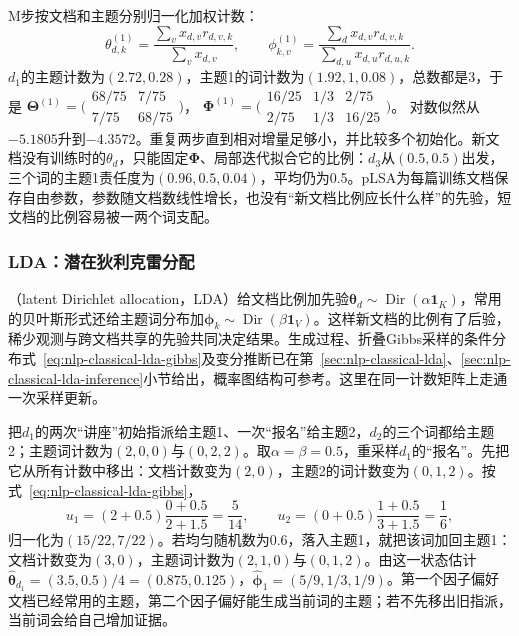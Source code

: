 M步按文档和主题分别归一化加权计数：
\[
 \theta_{d,k}^{(1)}=\frac{\sum_vx_{d,v}r_{d,v,k}}{\sum_vx_{d,v}},\qquad
 \phi_{k,v}^{(1)}=\frac{\sum_dx_{d,v}r_{d,v,k}}{\sum_{d,u}x_{d,u}r_{d,u,k}}.
\]
$d_1$的主题计数为$(2.72,0.28)$，主题1的词计数为$(1.92,1,0.08)$，总数都是3，于是
$\bm\Theta^{(1)}=\bigl(\begin{smallmatrix}68/75&7/75\\7/75&68/75\end{smallmatrix}\bigr)$，
$\bm\Phi^{(1)}=\bigl(\begin{smallmatrix}16/25&1/3&2/75\\2/75&1/3&16/25\end{smallmatrix}\bigr)$。
对数似然从$-5.1805$升到$-4.3572$。重复两步直到相对增量足够小，并比较多个初始化。新文档没有训练时的$\theta_d$，只能固定$\bm\Phi$、局部迭代拟合它的比例：$d_3$从$(0.5,0.5)$出发，三个词的主题1责任度为$(0.96,0.5,0.04)$，平均仍为0.5。pLSA为每篇训练文档保存自由参数，参数随文档数线性增长，也没有“新文档比例应长什么样”的先验，短文档的比例容易被一两个词支配。

\subsubsection{LDA：潜在狄利克雷分配}
\label{sec:nlp-classification-lda}

（latent Dirichlet allocation，LDA）给文档比例加先验$\bm\theta_d\sim\operatorname{Dir}(\alpha\bm1_K)$，常用的贝叶斯形式还给主题词分布加$\bm\phi_k\sim\operatorname{Dir}(\beta\bm1_V)$。这样新文档的比例有了后验，稀少观测与跨文档共享的先验共同决定结果。生成过程、折叠Gibbs采样的条件分布式~\eqref{eq:nlp-classical-lda-gibbs}及变分推断已在第~\ref{sec:nlp-classical-lda}、\ref{sec:nlp-classical-lda-inference}小节给出，概率图结构可参考。这里在同一计数矩阵上走通一次采样更新。

把$d_1$的两次“讲座”初始指派给主题1、一次“报名”给主题2，$d_2$的三个词都给主题2；主题词计数为$(2,0,0)$与$(0,2,2)$。取$\alpha=\beta=0.5$，重采样$d_1$的“报名”。先把它从所有计数中移出：文档计数变为$(2,0)$，主题2的词计数变为$(0,1,2)$。按式~\eqref{eq:nlp-classical-lda-gibbs}，
\[
 u_1=(2+0.5)\frac{0+0.5}{2+1.5}=\frac5{14},\qquad
 u_2=(0+0.5)\frac{1+0.5}{3+1.5}=\frac16,
\]
归一化为$(15/22,7/22)$。若均匀随机数为0.6，落入主题1，就把该词加回主题1：文档计数变为$(3,0)$，主题词计数为$(2,1,0)$与$(0,1,2)$。由这一状态估计$\widehat{\bm\theta}_{d_1}=(3.5,0.5)/4=(0.875,0.125)$，$\widehat{\bm\phi}_1=(5/9,1/3,1/9)$。第一个因子偏好文档已经常用的主题，第二个因子偏好能生成当前词的主题；若不先移出旧指派，当前词会给自己增加证据。

